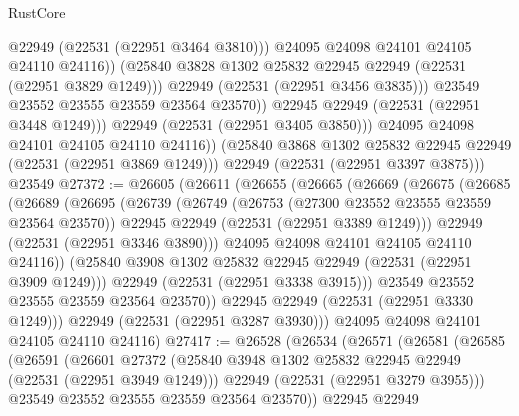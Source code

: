 \begin{lexlean}{RustCore}
\begin{coremodule}
                          @22949
                          (@22531 (@22951 @3464 @3810)))
                        @24095
                        @24098
                        @24101
                        @24105
                        @24110
                        @24116))
                    (@25840 @3828 @1302 @25832 @22945 @22949 (@22531 (@22951 @3829 @1249)))
                    @22949
                    (@22531 (@22951 @3456 @3835)))
                  @23549
                  @23552
                  @23555
                  @23559
                  @23564
                  @23570))
              @22945
              @22949
              (@22531 (@22951 @3448 @1249)))
            @22949
            (@22531 (@22951 @3405 @3850)))
          @24095
          @24098
          @24101
          @24105
          @24110
          @24116))
      (@25840 @3868 @1302 @25832 @22945 @22949 (@22531 (@22951 @3869 @1249)))
      @22949
      (@22531 (@22951 @3397 @3875)))
    @23549
@27372 := @26605
    (@26611
      (@26655
        (@26665
          (@26669
            (@26675
              (@26685
                (@26689
                  (@26695
                    (@26739
                      (@26749
                        (@26753 (@27300 @23552 @23555 @23559 @23564 @23570))
                        @22945
                        @22949
                        (@22531 (@22951 @3389 @1249)))
                      @22949
                      (@22531 (@22951 @3346 @3890)))
                    @24095
                    @24098
                    @24101
                    @24105
                    @24110
                    @24116))
                (@25840 @3908 @1302 @25832 @22945 @22949 (@22531 (@22951 @3909 @1249)))
                @22949
                (@22531 (@22951 @3338 @3915)))
              @23549
              @23552
              @23555
              @23559
              @23564
              @23570))
          @22945
          @22949
          (@22531 (@22951 @3330 @1249)))
        @22949
        (@22531 (@22951 @3287 @3930)))
      @24095
      @24098
      @24101
      @24105
      @24110
      @24116)
@27417 := @26528
    (@26534
      (@26571
        (@26581
          (@26585
            (@26591
              (@26601
                @27372
                (@25840 @3948 @1302 @25832 @22945 @22949 (@22531 (@22951 @3949 @1249)))
                @22949
                (@22531 (@22951 @3279 @3955)))
              @23549
              @23552
              @23555
              @23559
              @23564
              @23570))
          @22945
          @22949

\end{coremodule}
\end{lexlean}
